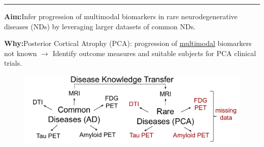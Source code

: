 \documentclass[portrait,a0,final,20pt]{a0poster}
\newcommand{\fnt}[1]{\LARGE{#1}}
\begin{document}
\fnt{


\newcommand{\lp}{\lambda_{d_i}^{k}}
\newcommand{\lpuu}{\lambda_{d_i}^{k,(u)}}
\newcommand{\lpum}{\lambda_{d_i}^{k,(u-1)}}

\newcommand{\cmark}{\ding{51}}%
\newcommand{\xmark}{\ding{55}}%

\newcommand{\yes}{{\LARGE \textcolor{green!50!black}{\cmark} \par}}
\newcommand{\no}{{\LARGE \textcolor{red}{\xmark} \par}}

\vspace{0.2em}
\hrule
\vspace{0.2em}

\newcommand{\heading}[1]{\noindent\textbf{\Huge{#1}}}

\begin{multicols}{2}							
\raggedcolumns							%

\pagenumbering{gobble}

\vspace{-3em}

\heading{Aim:}\;\;\;\;Infer progression of multimodal biomarkers in rare neurodegenerative diseases (NDs) by leveraging larger datasets of common NDs.


\heading{Why:}\;\;\;\;Posterior Cortical Atrophy (PCA): progression of \underline{multimodal} biomarkers not known $\rightarrow$ Identify outcome measures and suitable subjects for PCA clinical trials.

\columnbreak

% 
% 
%  
%   
%  

\begin{figure}[H]
 \centering
 \includegraphics[width=\columnwidth]{DKT_data_availability}
\end{figure}



\end{multicols}}
\end{document}
